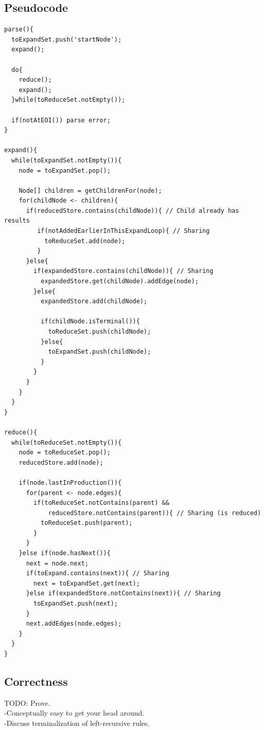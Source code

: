 \documentclass[a4paper,10pt]{article}
\begin{document}
\subsection{Pseudocode}

{\small
\begin{verbatim}
parse(){
  toExpandSet.push('startNode');
  expand();
  
  do{
    reduce();
    expand();
  }while(toReduceSet.notEmpty());
  
  if(notAtEOI()) parse error;
}

expand(){
  while(toExpandSet.notEmpty()){
    node = toExpandSet.pop();
    
    Node[] children = getChildrenFor(node);
    for(childNode <- children){
      if(reducedStore.contains(childNode)){ // Child already has results
         if(notAddedEarlierInThisExpandLoop){ // Sharing
           toReduceSet.add(node);
         }
      }else{
        if(expandedStore.contains(childNode)){ // Sharing
          expandedStore.get(childNode).addEdge(node);
        }else{
          expandedStore.add(childNode);
          
          if(childNode.isTerminal()){
            toReduceSet.push(childNode);
          }else{
            toExpandSet.push(childNode);
          }
        }
      }
    }
  }
}

reduce(){
  while(toReduceSet.notEmpty()){
    node = toReduceSet.pop();
    reducedStore.add(node);
    
    if(node.lastInProduction()){
      for(parent <- node.edges){
        if(toReduceSet.notContains(parent) &&
            reducedStore.notContains(parent)){ // Sharing (is reduced)
          toReduceSet.push(parent);
        }
      }
    }else if(node.hasNext()){
      next = node.next;
      if(toExpand.contains(next)){ // Sharing
        next = toExpandSet.get(next);
      }else if(expandedStore.notContains(next)){ // Sharing
        toExpandSet.push(next);
      }
      next.addEdges(node.edges);
    }
  }
}
\end{verbatim}
}

\subsection{Correctness}

TODO: Prove.\\
-Conceptually easy to get your head around.\\
-Discuss terminalization of left-recursive rules.
\end{document}
